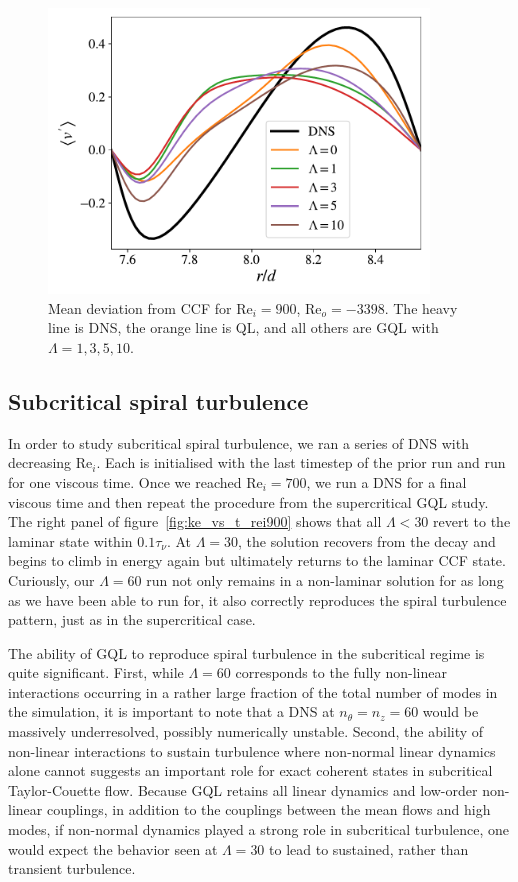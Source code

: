 \documentclass[openacc]{rstransa}%
\newcommand{\Reyn}{\mathrm{Re}}
\begin{document}
\begin{figure}
    \centering
    \includegraphics[width=0.9\textwidth]{figs/rei900_reo_-3398_vmean_profile.pdf}
    \caption{Mean deviation from CCF for $\Reyn_i = 900$, $\Reyn_o=-3398$. The heavy line is DNS, the orange line is QL, and all others are GQL with $\Lambda = 1,3,5,10$.}
    \label{fig:rei900_vmean}
\end{figure}

\subsection{Subcritical spiral turbulence}
In order to study subcritical spiral turbulence, we ran a series of DNS with decreasing $\Reyn_i$. Each is initialised with the last timestep of the prior run and run for one viscous time. Once we reached $\Reyn_i = 700$, we run a DNS for a final viscous time and then repeat the procedure from the supercritical GQL study. The right panel of figure~\ref{fig:ke_vs_t_rei900} shows  that all $\Lambda < 30$ revert to the laminar state within $0.1 \tau_\nu$. At $\Lambda = 30$, the solution recovers from the decay and begins to climb in energy again but ultimately returns to the laminar CCF state. Curiously, our $\Lambda = 60$ run not only remains in a non-laminar solution for as long as we have been able to run for, it also correctly reproduces the spiral turbulence pattern, just as in the supercritical case. 

The ability of GQL to reproduce spiral turbulence in the subcritical regime is quite significant. First, while $\Lambda = 60$ corresponds to the fully non-linear interactions occurring in a rather large fraction of the total number of modes in the simulation, it is important to note that a DNS at $n_\theta = n_z = 60$ would be massively underresolved, possibly numerically unstable. Second, the ability of non-linear interactions to sustain turbulence where non-normal linear dynamics alone cannot suggests an important role for exact coherent states in subcritical Taylor-Couette flow. Because GQL retains all linear dynamics and low-order non-linear couplings, in addition to the couplings between the mean flows and high modes, if non-normal dynamics played a strong role in subcritical turbulence, one would expect the behavior seen at $\Lambda = 30$ to lead to sustained, rather than transient turbulence. 
\end{document}
